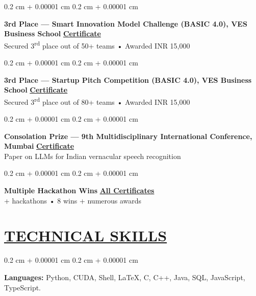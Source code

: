 \documentclass[10pt, letterpaper]{article}
\newenvironment{onecolentry}{
    \begin{adjustwidth}{
        0.2 cm + 0.00001 cm
    }{
        0.2 cm + 0.00001 cm
    }
}{
    \end{adjustwidth}
} %
\begin{document}
\vspace{0.04cm}

\begin{onecolentry}
    \textbf{3rd Place --- Smart Innovation Model Challenge (BASIC 4.0), VES Business School} \hfill
    \href{https://drive.google.com/file/d/1gR_DHY5O-q7P53vYykIHqebSZ0Y9dERi/view?usp=sharing}{\textbf{Certificate}} \\
    \quad Secured 3\textsuperscript{rd} place out of 50+ teams • Awarded INR 15,000
\end{onecolentry}

\vspace{0.04cm}

\begin{onecolentry}
    \textbf{3rd Place --- Startup Pitch Competition (BASIC 4.0), VES Business School} \hfill
    \href{https://drive.google.com/file/d/1gR_DHY5O-q7P53vYykIHqebSZ0Y9dERi/view?usp=sharing}{\textbf{Certificate}} \\
    \quad Secured 3\textsuperscript{rd} place out of 80+ teams • Awarded INR 15,000
\end{onecolentry}

\vspace{0.04cm}

\begin{onecolentry}
    \textbf{Consolation Prize --- 9th Multidisciplinary International Conference, Mumbai} \hfill
    \href{https://drive.google.com/file/d/1wo1nbaIiHtBG5m1MeAhg4zIopDcyNx8F/view?usp=sharing}{\textbf{Certificate}} \\
    \quad Paper on LLMs for Indian vernacular speech recognition
\end{onecolentry}

\vspace{0.04cm}

\begin{onecolentry}
    \textbf{Multiple Hackathon Wins} \hfill
    \href{https://drive.google.com/drive/folders/1Tsof25XI__cUZ2ZIg0Da_J6JF_640j-u?usp=sharing}{\textbf{All Certificates}} \\
    + hackathons • 8 wins + numerous awards
\end{onecolentry}

    \section{\href{https://www.harjot.info/\#Skills}{TECHNICAL SKILLS}}
        
        
        \begin{onecolentry}
            \textbf{Languages:} Python, CUDA, Shell, LaTeX, C, C++, Java, SQL, JavaScript, TypeScript.
        \end{onecolentry}
\end{document}
